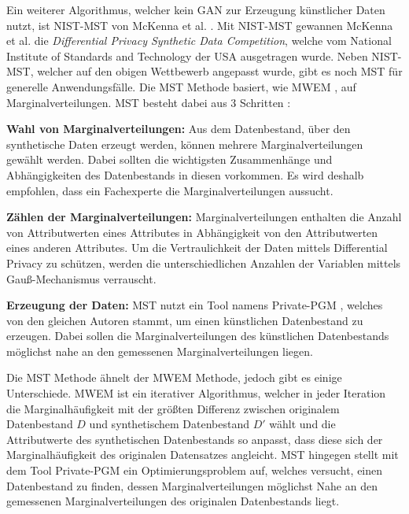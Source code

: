 Ein weiterer Algorithmus, welcher kein GAN zur Erzeugung künstlicher Daten nutzt, ist NIST-MST von McKenna et al. \cite{P-95}.
Mit NIST-MST gewannen McKenna et al. die \textit{Differential Privacy Synthetic Data Competition}, welche vom National Institute of Standards and Technology der USA ausgetragen wurde.
Neben NIST-MST, welcher auf den obigen Wettbewerb angepasst wurde, gibt es noch MST für generelle Anwendungsfälle.
Die MST Methode basiert, wie MWEM \cite{P-90}, auf Marginalverteilungen.
MST besteht dabei aus 3 Schritten \cite{P-95}:
\begin{compactenum}
    \item \textbf{Wahl von Marginalverteilungen:}  Aus dem Datenbestand, über den synthetische Daten erzeugt werden, können mehrere Marginalverteilungen gewählt werden. Dabei sollten die wichtigsten Zusammenhänge und Abhängigkeiten des Datenbestands in diesen vorkommen. Es wird deshalb empfohlen, dass ein Fachexperte die Marginalverteilungen aussucht.
    \item \textbf{Zählen der Marginalverteilungen:} Marginalverteilungen enthalten die Anzahl von Attributwerten eines Attributes in Abhängigkeit von den Attributwerten eines anderen Attributes. Um die Vertraulichkeit der Daten mittels Differential Privacy zu schützen, werden die unterschiedlichen Anzahlen der Variablen mittels Gauß-Mechanismus verrauscht.
    \item \textbf{Erzeugung der Daten:} MST nutzt ein Tool namens Private-PGM \cite{P-97}, welches von den gleichen Autoren stammt, um einen künstlichen Datenbestand zu erzeugen. Dabei sollen die Marginalverteilungen des künstlichen Datenbestands möglichst nahe an den gemessenen Marginalverteilungen liegen.
\end{compactenum}
Die MST Methode ähnelt der MWEM Methode, jedoch gibt es einige Unterschiede.
MWEM ist ein iterativer Algorithmus, welcher in jeder Iteration die Marginalhäufigkeit mit der größten Differenz zwischen originalem Datenbestand $D$ und synthetischem Datenbestand $D'$ wählt und die Attributwerte des synthetischen Datenbestands so anpasst, dass diese sich der Marginalhäufigkeit des originalen Datensatzes angleicht.
MST hingegen stellt mit dem Tool Private-PGM \cite{P-97} ein Optimierungsproblem auf, welches versucht, einen Datenbestand zu finden, dessen Marginalverteilungen möglichst Nahe an den gemessenen Marginalverteilungen des originalen Datenbestands liegt.